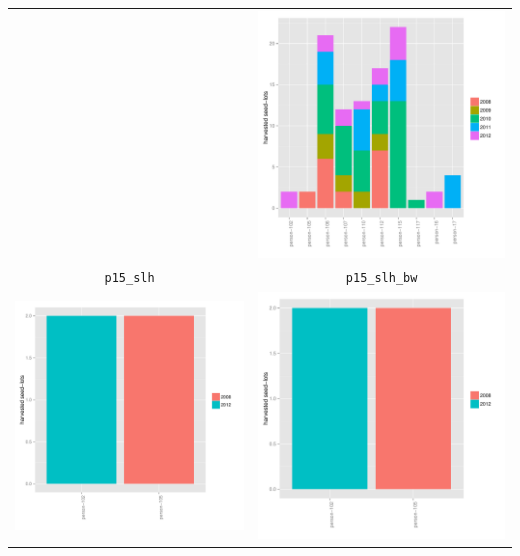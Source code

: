 \documentclass{article}\usepackage[]{graphicx}\usepackage[]{color}
\newenvironment{knitrout}{}{} %
\begin{document}
\begin{itemize}
\begin{center}
\begin{tabular}{cc}
\begin{knitrout}
{}



\end{knitrout}
&
\begin{knitrout}
\definecolor{shadecolor}{rgb}{0.969, 0.969, 0.969}\color{fgcolor}

{\centering \includegraphics[width=.4\textwidth]{figures/shinemas2R_unnamed-chunk-38-1} 

}



\end{knitrout}
\\
\texttt{p15\_slh} & \texttt{p15\_slh\_bw}  \\
\begin{knitrout}
\definecolor{shadecolor}{rgb}{0.969, 0.969, 0.969}\color{fgcolor}

{\centering \includegraphics[width=.4\textwidth]{figures/shinemas2R_unnamed-chunk-39-1} 

}



\end{knitrout}
&
\begin{knitrout}
\definecolor{shadecolor}{rgb}{0.969, 0.969, 0.969}\color{fgcolor}

{\centering \includegraphics[width=.4\textwidth]{figures/shinemas2R_unnamed-chunk-40-1} 

}
\end{knitrout}
\end{tabular}
\end{center}
\end{itemize}
\end{document}
